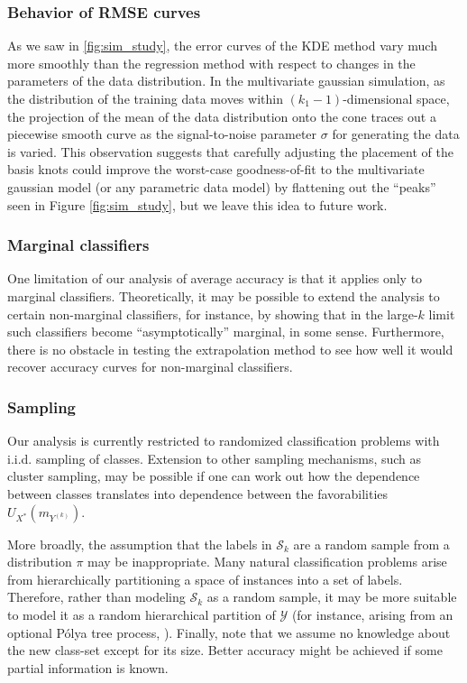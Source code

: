 \documentclass[twoside,11pt]{article}
\begin{document}
\subsubsection*{Behavior of RMSE curves}
As we saw in \ref{fig:sim_study}, the error curves of the KDE method
vary much more smoothly than the regression method with respect to
changes in the parameters of the data distribution.  In the
multivariate gaussian simulation, as the distribution of the training
data moves within $(k_1-1)$-dimensional space, the projection of the
mean of the data distribution onto the cone traces out a piecewise
smooth curve as the signal-to-noise parameter $\sigma$ for generating
the data is varied.  This observation suggests that carefully
adjusting the placement of the basis knots could improve the
worst-case goodness-of-fit to the multivariate gaussian model (or any
parametric data model) by flattening out the ``peaks'' seen in Figure
\ref{fig:sim_study}, but we leave this idea to future work.

\subsubsection*{Marginal classifiers}
One limitation of our analysis of average accuracy is that it applies
only to marginal classifiers.  Theoretically, it may be possible to
extend the analysis to certain non-marginal classifiers, for instance,
by showing that in the large-$k$ limit such classifiers become
``asymptotically'' marginal, in some sense. Furthermore,  
there is no obstacle in testing the extrapolation method to
see how well it would recover accuracy curves for non-marginal classifiers. 

\subsubsection*{Sampling}
Our analysis is currently restricted to
randomized classification problems with i.i.d. sampling of classes.
Extension to other sampling mechanisms, such as cluster sampling, may
be possible if one can work out how the dependence between classes
translates into dependence between the favorabilities
$U_{X^*}(m_{Y^{(k)}})$. 

More broadly, the assumption that the labels in $\mathcal{S}_k$ are a
random sample from a distribution $\pi$ may be inappropriate.  Many
natural classification problems arise from hierarchically partitioning
a space of instances into a set of labels.  Therefore, rather than
modeling $\mathcal{S}_k$ as a random sample, it may be more suitable
to model it as a random hierarchical partition of $\mathcal{Y}$ (for
instance, arising from an optional P{\'o}lya tree process,
\cite{wong2010optional}).
Finally, note that we assume no knowledge about the new class-set
except for its size. Better accuracy might be achieved if some partial information 
is known.
\end{document}
